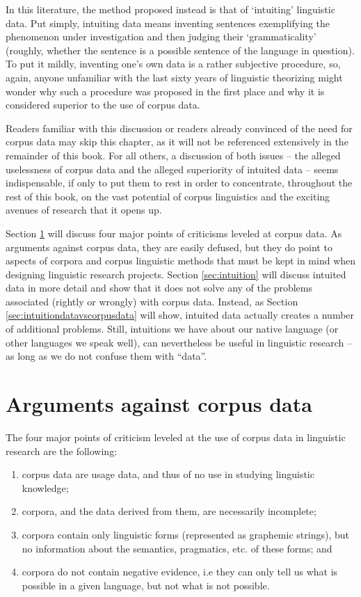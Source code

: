 In this literature, the method proposed instead is that of `intuiting' linguistic data. Put simply, intuiting data means inventing sentences exemplifying the phenomenon under investigation and then judging their `grammaticality' (roughly, whether the sentence is a possible sentence of the language in question). To put it mildly, inventing one's own data is a rather subjective procedure, so, again, anyone unfamiliar with the last sixty years of linguistic theorizing might wonder why such a procedure was proposed in the first place and why it is considered superior to the use of corpus data.

Readers familiar with this discussion or readers already convinced of the need for corpus data may skip this chapter, as it will not be referenced extensively in the remainder of this book. For all others, a discussion of both issues -- the alleged uselessness of corpus data and the alleged superiority of intuited data -- seems indispensable, if only to put them to rest in order to concentrate, throughout the rest of this book, on the vast potential of corpus linguistics and the exciting avenues of research that it opens up. 

Section \ref{sec:argumentsagainstcorpusdata} will discuss four major points of criticisms leveled at corpus data. As arguments against corpus data, they are easily defused, but they do point to aspects of corpora and corpus linguistic methods that must be kept in mind when designing linguistic research projects. Section \ref{sec:intuition} will discuss intuited data in more detail and show that it does not solve any of the problems associated (rightly or wrongly) with corpus data. Instead, as Section \ref{sec:intuitiondatavscorpusdata} will show, intuited data actually creates a number of additional problems. Still, intuitions we have about our native language (or other languages we speak well), can nevertheless be useful in linguistic research -- as long as we do not confuse them with ``data''.

\section{Arguments against corpus data}
\label{sec:argumentsagainstcorpusdata}

The four major points of criticism leveled at the use of corpus data in linguistic research are the following:

\begin{enumerate}
\item corpus data are usage data, and thus of no use in studying linguistic knowledge;
\item corpora, and the data derived from them, are necessarily incomplete;
\item corpora contain only linguistic forms (represented as graphemic strings), but no information about the semantics, pragmatics, etc. of these forms; and
\item corpora do not contain negative evidence, i.e they can only tell us what is possible in a given language, but not what is not possible.
\end{enumerate}


